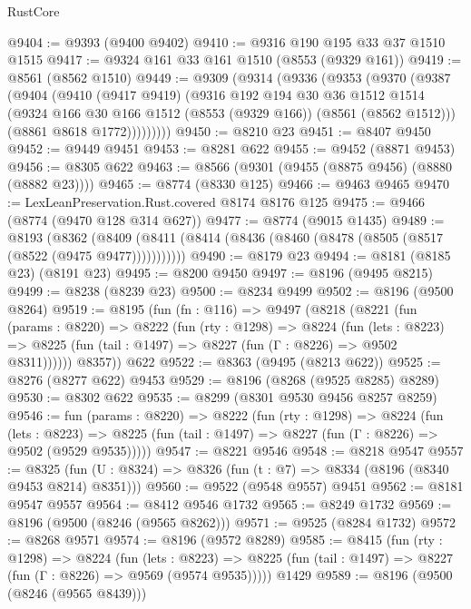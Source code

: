 \begin{lexlean}{RustCore}
\begin{coremodule}
@9404 := @9393 (@9400 @9402)
@9410 := @9316 @190 @195 @33 @37 @1510 @1515
@9417 := @9324 @161 @33 @161 @1510 (@8553 (@9329 @161))
@9419 := @8561 (@8562 @1510)
@9449 := @9309
    (@9314
      (@9336
        (@9353
          (@9370
            (@9387
              (@9404
                (@9410
                  (@9417 @9419)
                  (@9316
                    @192
                    @194
                    @30
                    @36
                    @1512
                    @1514
                    (@9324 @166 @30 @166 @1512 (@8553 (@9329 @166)) (@8561 (@8562 @1512)))
                    (@8861 @8618 @1772)))))))))
@9450 := @8210 @23
@9451 := @8407 @9450
@9452 := @9449 @9451
@9453 := @8281 @622
@9455 := @9452 (@8871 @9453)
@9456 := @8305 @622
@9463 := @8566 (@9301 (@9455 (@8875 @9456) (@8880 (@8882 @23))))
@9465 := @8774 (@8330 @125)
@9466 := @9463 @9465
@9470 := LexLeanPreservation.Rust.covered @8174 @8176 @125
@9475 := @9466 (@8774 (@9470 @128 @314 @627))
@9477 := @8774 (@9015 @1435)
@9489 := @8193
    (@8362 (@8409 (@8411 (@8414 (@8436 (@8460 (@8478 (@8505 (@8517 (@8522 (@9475 @9477)))))))))))
@9490 := @8179 @23
@9494 := @8181 (@8185 @23) (@8191 @23)
@9495 := @8200 @9450
@9497 := @8196 (@9495 @8215)
@9499 := @8238 (@8239 @23)
@9500 := @8234 @9499
@9502 := @8196 (@9500 @8264)
@9519 := @8195
    (fun (fn : @116) =>
    @9497
      (@8218
        (@8221
          (fun (params : @8220) =>
          @8222
            (fun (rty : @1298) =>
            @8224
              (fun (lets : @8223) =>
              @8225 (fun (tail : @1497) => @8227 (fun (Γ : @8226) => @9502 @8311))))))
        @8357))
    @622
@9522 := @8363 (@9495 (@8213 @622))
@9525 := @8276 (@8277 @622) @9453
@9529 := @8196 (@8268 (@9525 @8285) @8289)
@9530 := @8302 @622
@9535 := @8299 (@8301 @9530 @9456 @8257 @8259)
@9546 := fun (params : @8220) =>
  @8222
    (fun (rty : @1298) =>
    @8224
      (fun (lets : @8223) =>
      @8225 (fun (tail : @1497) => @8227 (fun (Γ : @8226) => @9502 (@9529 @9535)))))
@9547 := @8221 @9546
@9548 := @8218 @9547
@9557 := @8325 (fun (U : @8324) => @8326 (fun (t : @7) => @8334 (@8196 (@8340 @9453 @8214) @8351)))
@9560 := @9522 (@9548 @9557) @9451
@9562 := @8181 @9547 @9557
@9564 := @8412 @9546 @1732
@9565 := @8249 @1732
@9569 := @8196 (@9500 (@8246 (@9565 @8262)))
@9571 := @9525 (@8284 @1732)
@9572 := @8268 @9571
@9574 := @8196 (@9572 @8289)
@9585 := @8415
    (fun (rty : @1298) =>
    @8224
      (fun (lets : @8223) =>
      @8225 (fun (tail : @1497) => @8227 (fun (Γ : @8226) => @9569 (@9574 @9535)))))
    @1429
@9589 := @8196 (@9500 (@8246 (@9565 @8439)))

\end{coremodule}
\end{lexlean}
